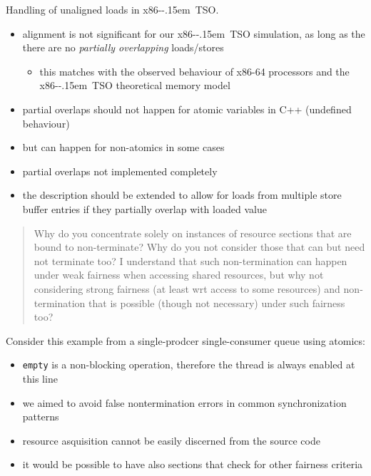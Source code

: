 \documentclass[aspectratio=169, fi]{paradise-slide}
\newcommand{\xtso}{\mbox{x86-\kern-.15em TSO}\xspace}
\newcommand{\rquote}[1]{\begin{quote}#1\end{quote}\bigskip\setlength{\leftmargini}{1em}}
\begin{document}
\begin{frame}[noframenumbering]{\qtitle}
  Handling of unaligned loads in \xtso.\bigskip

  \begin{itemize}
    \item alignment is not significant for our \xtso simulation, as long as the there are no
      \emph{partially overlapping} loads/stores
      \begin{itemize}
        \item this matches with the observed behaviour of x86-64 processors and the \xtso
          theoretical memory model
      \end{itemize}
    \item partial overlaps should not happen for atomic variables in C++ (undefined behaviour)
    \item but can happen for non-atomics in some cases
    \bigskip
    \item partial overlaps not implemented completely
    \item the description should be extended to allow for loads from multiple store buffer entries
      if they partially overlap with loaded value
  \end{itemize}
\end{frame}

\begin{frame}{\qtitle}
  \rquote{Why do you concentrate solely on instances of resource sections that are bound to
    non-terminate? Why do you not consider those that can but need not terminate too? I understand
    that such non-termination can happen under weak fairness when accessing shared resources, but
    why not considering strong fairness (at least wrt access to some resources) and non-termination
    that is possible (though not necessary) under such fairness too?}

  Consider this example from a single-prodcer single-consumer queue using atomics:
  \begin{cppcode}
    T &front() {
        while ( empty() ) { /* wait */ }
        // ...
  \end{cppcode}
  \begin{itemize}
    \item \texttt{empty} is a non-blocking operation, therefore the thread is always enabled at this line
    \item we aimed to avoid false nontermination errors in common synchronization patterns
    \item resource asquisition cannot be easily discerned from the source code
    \item it would be possible to have also sections that check for other fairness criteria
  \end{itemize}
\end{frame}
\end{document}
